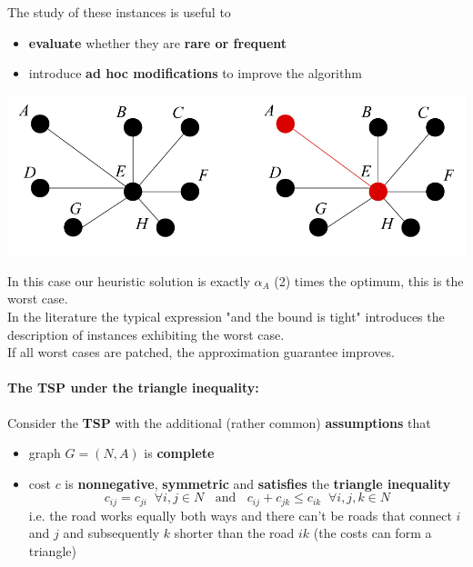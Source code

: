 \documentclass[11pt]{article}
\begin{document}
	The study of these instances is useful to
	\begin{itemize}
		\item \textbf{evaluate} whether they are \textbf{rare or frequent}
		\item introduce \textbf{ad hoc modifications} to improve the algorithm
	\end{itemize}
	\begin{center}
		\includegraphics[width=0.8\columnwidth]{img/VCP2Approx2}
	\end{center}
	In this case our heuristic solution is exactly $\alpha_A$ (2) times the optimum, this is the worst case.\\
	
	In the literature the typical expression "and the bound is tight" introduces the description of instances exhibiting the worst case.\\
	If all worst cases are patched, the approximation guarantee improves.\\
	
	\newpage
	
	\paragraph{The TSP under the triangle inequality:} Consider the \textbf{TSP} with the additional (rather common) \textbf{assumptions} that
	\begin{itemize}
		\item graph $G = (N, A)$ is \textbf{complete}
		\item cost $c$ is \textbf{nonnegative}, \textbf{symmetric} and \textbf{satisfies} the \textbf{triangle inequality}
		$$ c_{ij} = c_{ji} \;\; \forall i,j \in N \;\; \text{ and } \;\; c_{ij} + c_{jk} \leq c_{ik} \;\; \forall i,j,k \in N $$
		i.e. the road works equally both ways and there can't be roads that connect $i$ and $j$ and subsequently $k$ shorter than the road $ik$ (the costs can form a triangle)
	\end{itemize}
	
\end{document}
